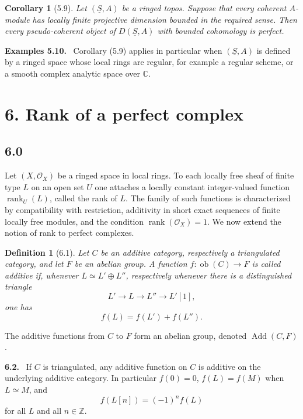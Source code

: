 \documentclass[13pt]{extarticle}
\newcommand{\ZZ}{\mathbb Z}
\newcommand{\cO}{\mathcal O}
\newcommand{\uS}{\underline S}
\newcommand{\ob}{\operatorname{ob}}
\newcommand{\Add}{\operatorname{Add}}
\newenvironment{statement}[1]{\par\medskip\noindent\textbf{#1.}\ }{\par\medskip}
\newtheorem*{corollary*}{Corollary}
\newtheorem*{definition*}{Definition}
\begin{document}
\begin{corollary*}[5.9]
Let $(\uS,A)$ be a ringed topos. Suppose that every coherent $A$-module has locally finite projective dimension bounded in the required sense. Then every pseudo-coherent object of $D(\uS,A)$ with bounded cohomology is perfect.
\end{corollary*}

\begin{statement}{Examples 5.10}
Corollary (5.9) applies in particular when $(\uS,A)$ is defined by a ringed space whose local rings are regular, for example a regular scheme, or a smooth complex analytic space over $\mathbb C$.
\end{statement}

\section*{6. Rank of a perfect complex}

\subsection*{6.0}
Let $(X,\cO_X)$ be a ringed space in local rings. To each locally free sheaf of finite type $L$ on an open set $U$ one attaches a locally constant integer-valued function $\operatorname{rank}_U(L)$, called the rank of $L$. The family of such functions is characterized by compatibility with restriction, additivity in short exact sequences of finite locally free modules, and the condition $\operatorname{rank}(\cO_X)=1$. We now extend the notion of rank to perfect complexes.

\begin{definition*}[6.1]
Let $C$ be an additive category, respectively a triangulated category, and let $F$ be an abelian group. A function $f:\ob(C)\to F$ is called \emph{additive} if, whenever $L\simeq L'\oplus L''$, respectively whenever there is a distinguished triangle
\[
L'\longrightarrow L\longrightarrow L''\longrightarrow L'[1],
\]
one has
\[
f(L)=f(L')+f(L'').
\]
\end{definition*}

The additive functions from $C$ to $F$ form an abelian group, denoted $\Add(C,F)$.

\begin{statement}{6.2}
If $C$ is triangulated, any additive function on $C$ is additive on the underlying additive category. In particular $f(0)=0$, $f(L)=f(M)$ when $L\simeq M$, and
\[
f(L[n])=(-1)^n f(L)
\]
for all $L$ and all $n\in\ZZ$.
\end{statement}
\end{document}
